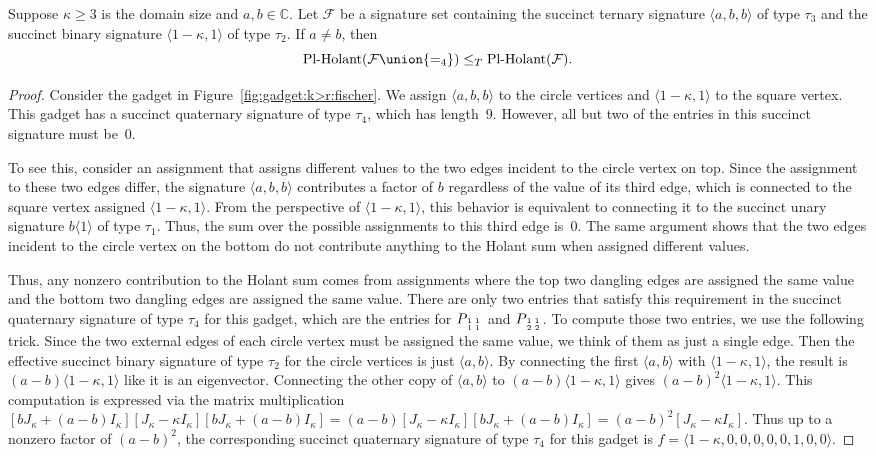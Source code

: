 \documentclass[11pt]{article}
\newcommand{\PlHolant}{\operatorname{Pl-Holant}}
\newcommand{\subMat}[4]{\mbox{\scriptsize $\begin{smallmatrix} #1 & #4 \\ #2 & #3 \end{smallmatrix}$}}
\begin{document}
\begin{lemma} \label{lem:k>r:interpolate_equality4}
 Suppose $\kappa \ge 3$ is the domain size and $a, b \in \mathbb{C}$.
 Let $\mathcal{F}$ be a signature set containing the succinct ternary signature $\langle a,b,b \rangle$ of type $\tau_3$
 and the succinct binary signature $\langle 1 - \kappa, 1 \rangle$ of type $\tau_2$.
 If $a \ne b$,
 then
 \[
  \PlHolant(\mathcal{F} \union \{=_4\}) \le_T \PlHolant(\mathcal{F}).
 \]
\end{lemma}

\begin{proof}
 Consider the gadget in Figure~\ref{fig:gadget:k>r:fischer}.
 We assign $\langle a,b,b \rangle$ to the circle vertices and $\langle 1 - \kappa, 1 \rangle$ to the square vertex.
 This gadget has a succinct quaternary signature of type $\tau_4$,
 which has length~$9$.
 However, all but two of the entries in this succinct signature must be~$0$.
 
 To see this,
 consider an assignment that assigns different values to the two edges incident to the circle vertex on top.
 Since the assignment to these two edges differ,
 the signature $\langle a,b,b \rangle$ contributes a factor of $b$ regardless of the value of its third edge,
 which is connected to the square vertex assigned $\langle 1 - \kappa, 1 \rangle$.
 From the perspective of $\langle 1 - \kappa, 1 \rangle$,
 this behavior is equivalent to connecting it to the succinct unary signature $b \langle 1 \rangle$ of type $\tau_1$.
 Thus, the sum over the possible assignments to this third edge is~$0$.
 The same argument shows that the two edges incident to the circle vertex on the bottom
 do not contribute anything to the Holant sum when assigned different values.
 
 Thus, any nonzero contribution to the Holant sum comes from assignments
 where the top two dangling edges are assigned the same value and the bottom two dangling edges are assigned the same value.
 There are only two entries that satisfy this requirement in the succinct quaternary signature of type $\tau_4$ for this gadget,
 which are the entries for $P_{\subMat{1}{1}{1}{1}}$ and $P_{\subMat{1}{2}{2}{1}}$.
 To compute those two entries,
 we use the following trick.
 Since the two external edges of each circle vertex must be assigned the same value,
 we think of them as just a single edge.
 Then the effective succinct binary signature of type $\tau_2$ for the circle vertices is just $\langle a,b \rangle$.
 By connecting the first $\langle a,b \rangle$ with $\langle 1-\kappa, 1 \rangle$,
 the result is $(a-b) \langle 1-\kappa, 1 \rangle$ like it is an eigenvector.
 Connecting the other copy of $\langle a,b \rangle$ to $(a-b) \langle 1-\kappa, 1 \rangle$ gives $(a-b)^2 \langle 1-\kappa, 1 \rangle$.
 This computation is expressed via the matrix multiplication
 $[b J_\kappa + (a - b) I_\kappa] [J_\kappa - \kappa I_\kappa] [b J_\kappa + (a - b) I_\kappa]
 = (a - b) [J_\kappa - \kappa I_\kappa] [b J_\kappa + (a - b) I_\kappa]
 = (a - b)^2 [J_\kappa - \kappa I_\kappa]$.
 Thus up to a nonzero factor of $(a-b)^2$,
 the corresponding succinct quaternary signature of type $\tau_4$ for this gadget is $f = \langle 1-\kappa,0,0,0,0,0,1,0,0 \rangle$.
 

\end{proof}
\end{document}
